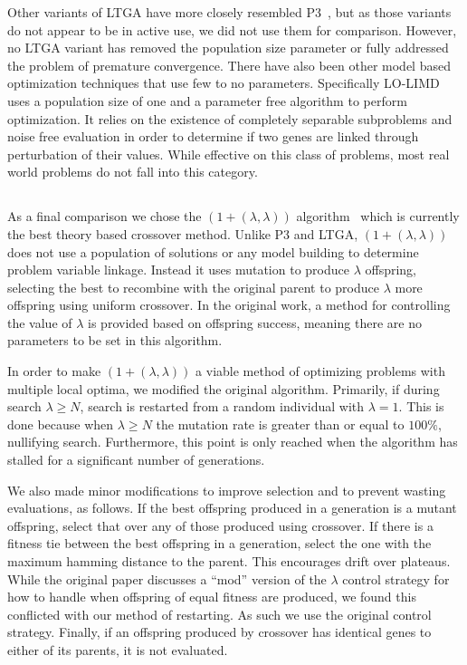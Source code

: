 \documentclass{sig-alternate}
\begin{document}
Other variants of LTGA have more closely resembled P3~\cite{goldman:2012:ltga},
but as those variants do not appear to be in active use, we did not use them for comparison.
However, no LTGA variant has removed the population size parameter
or fully addressed the problem of premature convergence.
There have also been other model based optimization techniques that use few to
no parameters.  Specifically LO-LIMD~\cite{posik:2011:parameterless} uses a
population size of one and a parameter free algorithm to perform optimization.
It relies on the existence of completely separable subproblems and noise free evaluation in order to determine
if two genes are linked through perturbation of their values.  While effective on
this class of problems, most real world problems do not fall into this category.

\subsection{}
As a final comparison we chose the $(1+(\lambda,\lambda))$ algorithm~\cite{doerr:2013:lambdalambda}
which is currently the best theory based crossover method.  Unlike P3 and LTGA,
$(1+(\lambda,\lambda))$ does not use a population of solutions or any model building
to determine problem variable linkage.  Instead it uses mutation to produce $\lambda$
offspring, selecting the best to recombine with the original parent to produce $\lambda$
more offspring using uniform crossover.  In the original work, a method for controlling
the value of $\lambda$ is provided based on offspring success, meaning there are no
parameters to be set in this algorithm.

In order to make $(1+(\lambda,\lambda))$ a viable method of optimizing problems
with multiple local optima, we modified the original algorithm.  Primarily, if
during search $\lambda \ge N$, search is restarted from a random individual with
$\lambda=1$.  This is done because when $\lambda \ge N$ the mutation rate is greater
than or equal to $100\%$, nullifying search.  Furthermore, this point is only reached
when the algorithm has stalled for a significant number of generations.

We also made minor modifications to improve selection and to prevent wasting evaluations, as follows.
If the best offspring produced in a generation is a mutant offspring, select that
over any of those produced using crossover.  If there is a fitness tie between the
best offspring in a generation, select the one with the maximum hamming distance
to the parent.  This encourages drift over plateaus.  While the original paper
discusses a ``mod'' version of the $\lambda$ control strategy for how to handle
when offspring of equal fitness are produced, we found this conflicted with our
method of restarting.  As such we use the original control strategy. %
Finally, if an offspring produced by crossover has identical genes to either of its parents,
it is not evaluated.
\end{document}
